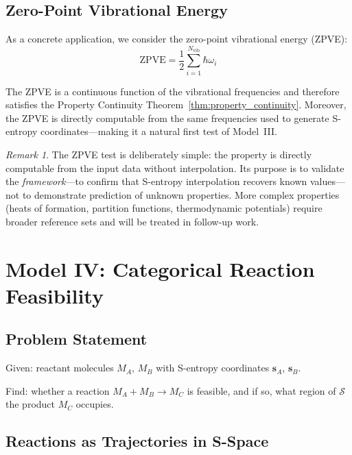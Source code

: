 \documentclass[11pt,twocolumn,a4paper]{article}
\theoremstyle{definition}
\theoremstyle{remark}
\newtheorem{remark}[theorem]{Remark}
\newcommand{\Sspace}{\mathcal{S}}
\newcommand{\Nvib}{N_{\mathrm{vib}}}
\begin{document}
\subsection{Zero-Point Vibrational Energy}

As a concrete application, we consider the zero-point vibrational energy (ZPVE):
\begin{equation}
\text{ZPVE} = \frac{1}{2} \sum_{i=1}^{\Nvib} \hbar \omega_i
\label{eq:zpve}
\end{equation}

The ZPVE is a continuous function of the vibrational frequencies and therefore satisfies the Property Continuity Theorem~\ref{thm:property_continuity}. Moreover, the ZPVE is directly computable from the same frequencies used to generate S-entropy coordinates---making it a natural first test of Model~III.

\begin{remark}
The ZPVE test is deliberately simple: the property is directly computable from the input data without interpolation. Its purpose is to validate the \emph{framework}---to confirm that S-entropy interpolation recovers known values---not to demonstrate prediction of unknown properties. More complex properties (heats of formation, partition functions, thermodynamic potentials) require broader reference sets and will be treated in follow-up work.
\end{remark}


\section{Model IV: Categorical Reaction Feasibility}
\label{sec:model4}

\subsection{Problem Statement}

Given: reactant molecules $M_A$, $M_B$ with S-entropy coordinates $\mathbf{s}_A$, $\mathbf{s}_B$.

Find: whether a reaction $M_A + M_B \to M_C$ is feasible, and if so, what region of $\Sspace$ the product $M_C$ occupies.

\subsection{Reactions as Trajectories in S-Space}
\end{document}
